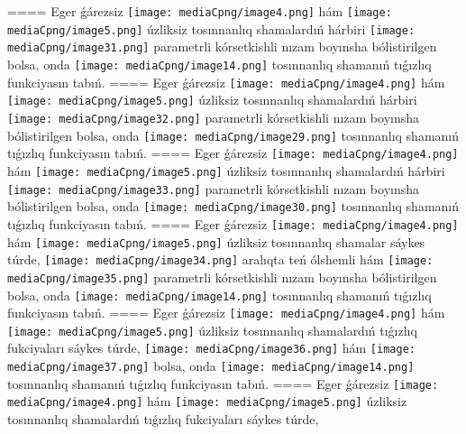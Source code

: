 ====
Eger ǵárezsiz \texttt{[image: mediaCpng/image4.png]} hám \texttt{[image: mediaCpng/image5.png]} úzliksiz tosınnanlıq shamalardıń hárbiri \texttt{[image: mediaCpng/image31.png]} parametrli kórsetkishli nızam boyınsha bólistirilgen bolsa, onda \texttt{[image: mediaCpng/image14.png]} tosınnanlıq shamanıń tıǵızlıq funkciyasın tabıń.
====
Eger ǵárezsiz \texttt{[image: mediaCpng/image4.png]} hám \texttt{[image: mediaCpng/image5.png]} úzliksiz tosınnanlıq shamalardıń hárbiri \texttt{[image: mediaCpng/image32.png]} parametrli kórsetkishli nızam boyınsha bólistirilgen bolsa, onda \texttt{[image: mediaCpng/image29.png]} tosınnanlıq shamanıń tıǵızlıq funkciyasın tabıń.
====
Eger ǵárezsiz \texttt{[image: mediaCpng/image4.png]} hám \texttt{[image: mediaCpng/image5.png]} úzliksiz tosınnanlıq shamalardıń hárbiri \texttt{[image: mediaCpng/image33.png]} parametrli kórsetkishli nızam boyınsha bólistirilgen bolsa, onda \texttt{[image: mediaCpng/image30.png]} tosınnanlıq shamanıń tıǵızlıq funkciyasın tabıń.
====
Eger ǵárezsiz \texttt{[image: mediaCpng/image4.png]} hám \texttt{[image: mediaCpng/image5.png]} úzliksiz tosınnanlıq shamalar sáykes túrde, \texttt{[image: mediaCpng/image34.png]} aralıqta teń ólshemli hám \texttt{[image: mediaCpng/image35.png]} parametrli kórsetkishli nızam boyınsha bólistirilgen bolsa, onda \texttt{[image: mediaCpng/image14.png]} tosınnanlıq shamanıń tıǵızlıq funkciyasın tabıń.
====
Eger ǵárezsiz \texttt{[image: mediaCpng/image4.png]} hám \texttt{[image: mediaCpng/image5.png]} úzliksiz tosınnanlıq shamalardıń tıǵızlıq fukciyaları sáykes túrde,
\texttt{[image: mediaCpng/image36.png]} hám \texttt{[image: mediaCpng/image37.png]}
bolsa, onda \texttt{[image: mediaCpng/image14.png]} tosınnanlıq shamanıń tıǵızlıq funkciyasın tabıń.
====
Eger ǵárezsiz \texttt{[image: mediaCpng/image4.png]} hám \texttt{[image: mediaCpng/image5.png]} úzliksiz tosınnanlıq shamalardıń tıǵızlıq fukciyaları sáykes túrde,
